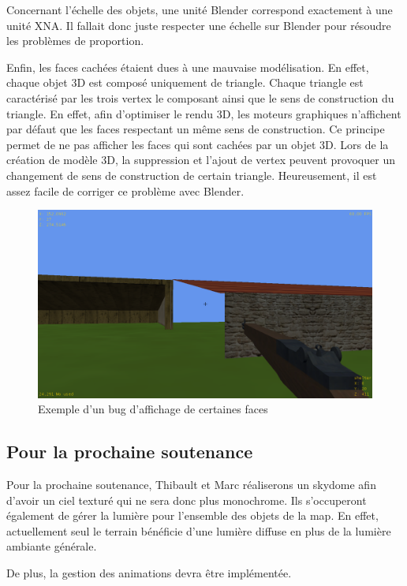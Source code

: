\documentclass[11pt]{report}
\begin{document}
Concernant l’échelle des objets, une unité Blender correspond exactement à une unité XNA. Il fallait donc juste respecter une échelle sur Blender pour résoudre les problèmes de proportion.

Enfin, les faces cachées étaient dues à une mauvaise modélisation. En effet, chaque objet 3D est composé uniquement de triangle. Chaque triangle est caractérisé par les trois vertex le composant ainsi que le sens de construction du triangle. En effet, afin d'optimiser le rendu 3D, les moteurs graphiques n'affichent par défaut que les faces respectant un même sens de construction. Ce principe permet de ne pas afficher les faces qui sont cachées par un objet 3D. Lors de la création de modèle 3D, la suppression et l'ajout de vertex peuvent provoquer un changement de sens de construction de certain triangle. Heureusement, il est assez facile de corriger ce problème avec Blender.

\begin{figure}[htbp]
\centering
\includegraphics[scale=0.25]{bug-affichage.png}
\caption{Exemple d'un bug d'affichage de certaines faces}
\end{figure}

\subsection{Pour la prochaine soutenance}

Pour la prochaine soutenance, Thibault et Marc réaliserons un skydome afin d'avoir un ciel texturé qui ne sera donc plus monochrome. Ils s'occuperont également de gérer la lumière pour l'ensemble des objets de la map. En effet, actuellement seul le terrain bénéficie d'une lumière diffuse en plus de la lumière ambiante générale.

De plus, la gestion des animations devra être implémentée.
\end{document}
